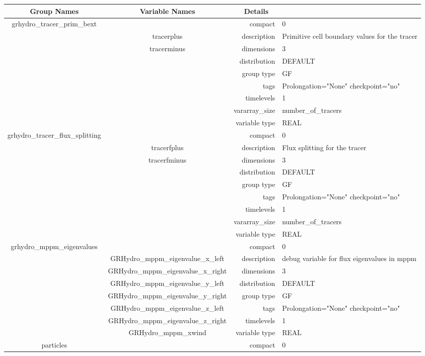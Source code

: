 \begin{tabular*}{150mm}{|c|c@{\extracolsep{\fill}}|rl|} \hline 
~ {\bf Group Names} ~ & ~ {\bf Variable Names} ~  &{\bf Details} ~ & ~ \\ 
\hline 
grhydro\_tracer\_prim\_bext &  & compact & 0 \\ 
 & tracerplus & description & Primitive cell boundary values for the tracer \\ 
 & tracerminus & dimensions & 3 \\ 
 &  & distribution & DEFAULT \\ 
 &  & group type & GF \\ 
 &  & tags & Prolongation="None" checkpoint="no" \\ 
 &  & timelevels & 1 \\ 
 &  & vararray\_size & number\_of\_tracers \\ 
 &  & variable type & REAL \\ 
\hline 
grhydro\_tracer\_flux\_splitting &  & compact & 0 \\ 
 & tracerfplus & description & Flux splitting for the tracer \\ 
 & tracerfminus & dimensions & 3 \\ 
 &  & distribution & DEFAULT \\ 
 &  & group type & GF \\ 
 &  & tags & Prolongation="None" checkpoint="no" \\ 
 &  & timelevels & 1 \\ 
 &  & vararray\_size & number\_of\_tracers \\ 
 &  & variable type & REAL \\ 
\hline 
grhydro\_mppm\_eigenvalues &  & compact & 0 \\ 
 & GRHydro\_mppm\_eigenvalue\_x\_left & description & debug variable for flux eigenvalues in mppm \\ 
 & GRHydro\_mppm\_eigenvalue\_x\_right & dimensions & 3 \\ 
 & GRHydro\_mppm\_eigenvalue\_y\_left & distribution & DEFAULT \\ 
 & GRHydro\_mppm\_eigenvalue\_y\_right & group type & GF \\ 
 & GRHydro\_mppm\_eigenvalue\_z\_left & tags & Prolongation="None" checkpoint="no" \\ 
 & GRHydro\_mppm\_eigenvalue\_z\_right & timelevels & 1 \\ 
 & GRHydro\_mppm\_xwind & variable type & REAL \\ 
\hline 
particles &  & compact & 0 \\ 

\end{tabular*}
